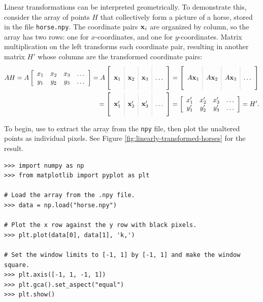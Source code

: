 Linear transformations can be interpreted geometrically.
To demonstrate this, consider the array of points $H$ that collectively form a picture of a horse, stored in the file \texttt{horse.npy}.
The coordinate pairs $\mathbf{x}_i$ are organized by column, so the array has two rows: one for $x$-coordinates, and one for $y$-coordinates.
Matrix multiplication on the left transforms each coordinate pair, resulting in another matrix $H'$ whose columns are the transformed coordinate pairs:
\begin{align*}
AH = A\left[\begin{array}{cccc}
x_1 & x_2 & x_3 & \ldots \\
y_1 & y_2 & y_3 & \ldots \\
\end{array}\right]
=
A\left[\begin{array}{c|c|c|c}
\arrayrulecolor{lightgray}
& & & \\
\x_1 & \x_2 & \x_3 & \ldots \\
& & &
\end{array}\right]
&=
\left[\begin{array}{c|c|c|c}
\arrayrulecolor{lightgray}
& & & \\
A\x_1 & A\x_2 & A\x_3 & \ldots \\
& & &
\end{array}\right]
\\ =
\left[\begin{array}{c|c|c|c}
\arrayrulecolor{lightgray}
& & & \\
\x_1' & \x_2' & \x_3' & \ldots \\
& & &
\end{array}\right]
&=
\left[\begin{array}{cccc}
x_1' & x_2' & x_3' & \ldots \\
y_1' & y_2' & y_3' & \ldots \\
\end{array}\right]
= H'.
\end{align*}

To begin, use  to extract the array from the \texttt{npy} file, then plot the unaltered points as individual pixels.
See Figure \ref{fig:linearly-transformed-horses} for the result.

\begin{lstlisting}
>>> import numpy as np
>>> from matplotlib import pyplot as plt

# Load the array from the .npy file.
>>> data = np.load("horse.npy")

# Plot the x row against the y row with black pixels.
>>> plt.plot(data[0], data[1], 'k,')

# Set the window limits to [-1, 1] by [-1, 1] and make the window square.
>>> plt.axis([-1, 1, -1, 1])
>>> plt.gca().set_aspect("equal")
>>> plt.show()
\end{lstlisting}

